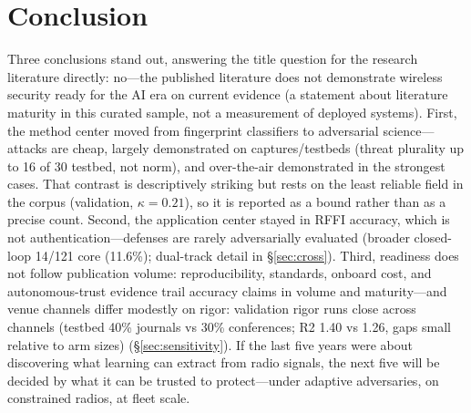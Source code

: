 \documentclass[10.5pt,compsoc,winfonts]{ICN}
\begin{document}
\section{Conclusion}
\label{sec:conclusion}
Three conclusions stand out, answering the title question for the research literature directly: no—the published literature does not demonstrate wireless security ready for the AI era on current evidence (a statement about literature maturity in this curated sample, not a measurement of deployed systems). First, the method center moved from fingerprint classifiers to adversarial science—attacks are cheap, largely demonstrated on captures/testbeds (threat plurality up to 16 of 30 testbed, not norm), and over-the-air demonstrated in the strongest cases. That contrast is descriptively striking but rests on the least reliable field in the corpus (validation, $\kappa = 0.21$), so it is reported as a bound rather than as a precise count. Second, the application center stayed in RFFI accuracy, which is not authentication—defenses are rarely adversarially evaluated (broader closed-loop 14/121 core (11.6\%); dual-track detail in \S\ref{sec:cross}). Third, readiness does not follow publication volume: reproducibility, standards, onboard cost, and autonomous-trust evidence trail accuracy claims in volume and maturity—and venue channels differ modestly on rigor: validation rigor runs close across channels (testbed 40\% journals vs 30\% conferences; R2 1.40 vs 1.26, gaps small relative to arm sizes) (\S\ref{sec:sensitivity}). If the last five years were about discovering what learning can extract from radio signals, the next five will be decided by what it can be trusted to protect—under adaptive adversaries, on constrained radios, at fleet scale.

\appendix
\end{document}
